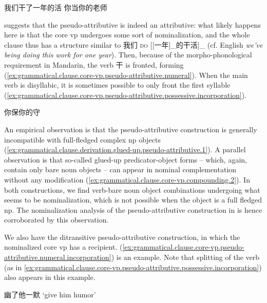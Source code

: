 \documentclass[UTF8, a4paper, oneside, scheme=plain, 12pt]{ctexrep}
\newcommand{\form}[1]{\emph{#1}}
\newcommand{\translate}[1]{`#1'}
\newcommand*{\category}[1]{\textsc{#1}}
\begin{document}
\begin{exe}
    \ex\label{ex:grammatical.clause.core-vp.pseudo-attributive.numeral} 我们干了一年的活
    \ex\label{ex:grammatical.clause.core-vp.pseudo-attributive.possessive} 你当你的老师
\end{exe}

\citet{huang2008} suggests that the pseudo-attributive is indeed an attributive:
what likely happens here is that the core \ac{vp} undergoes some sort of nominalization,
and the whole clause thus has a structure similar to 
我们 \category{do} [[一年]_{}的干活]_{} 
(cf. English \form{we've being doing this work for one year}).
Then, because of the morpho-phonological requirement in Mandarin,
the verb 干 is fronted, forming (\ref{ex:grammatical.clause.core-vp.pseudo-attributive.numeral}).
When the main verb is disyllabic, it is sometimes possible to only front the first syllable
(\ref{ex:grammatical.clause.core-vp.pseudo-attributive.possessive.incorporation}).

\begin{exe}
    \ex\label{ex:grammatical.clause.core-vp.pseudo-attributive.possessive.incorporation} 你保你的守
\end{exe}

An empirical observation is that the pseudo-attributive construction
is generally incompatible with full-fledged complex \ac{np} objects
(\ref{ex:grammatical.clause.derivation.glued-up.pseudo-attributive.1}).
A parallel observation is that 
so-called glued-up predicator-object forms -- which, again, contain only bare noun objects --
can appear in nominal complementation without any modification
(\ref{ex:grammatical.clause.core-vp.compounding.2}).
In both constructions, we find verb-bare noun object combinations undergoing
what seems to be nominalization,
which is not possible when the object is a full fledged \ac{np}.
The nominalization analysis of the pseudo-attributive construction in \citet{huang2008}
is hence corroborated by this observation.

We also have the ditransitive pseudo-attributive construction,
in which the nominalized core \ac{vp} has a recipient.
(\ref{ex:grammatical.clause.core-vp.pseudo-attributive.numeral.incorporation})
is an example.
Note that splitting of the verb (as in \ref{ex:grammatical.clause.core-vp.pseudo-attributive.possessive.incorporation}) also appears in this example.

\begin{exe}
    \ex\label{ex:grammatical.clause.core-vp.pseudo-attributive.numeral.incorporation} 幽了他一默 \translate{give him humor}
\end{exe}
\end{document}
